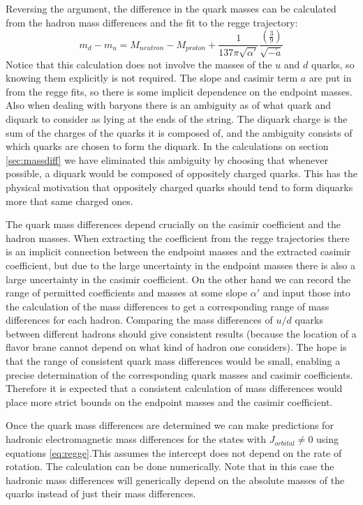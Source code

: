 \documentclass[11pt,a4paper]{article}
\begin{document}
Reversing the argument, the difference in the quark masses can be calculated from the hadron mass differences and the fit to the regge trajectory:
\begin{equation*}
m_{d}-m_{u}=M_{neutron}-M_{proton}+\frac{1}{137\pi\sqrt{\alpha'}}\frac{\left(\frac{3}{9}\right)}{\sqrt{-\tilde{a}}}
\end{equation*} 
Notice that this calculation does not involve the masses of the $u$ and $d$ quarks, so knowing them explicitly is not required. The slope and casimir term $a$ are put in from the regge fits, so there is some implicit dependence on the endpoint masses. Also when dealing with baryons there is an ambiguity as of what quark and diquark to consider as lying at the ends of the string. The diquark charge is the sum of the charges of the quarks it is composed of, and the ambiguity consists of which quarks are chosen to form the diquark. In the calculations on section \ref{sec:massdiff} we have eliminated this ambiguity by choosing that whenever possible, a diquark would be composed of oppositely charged quarks. This has the physical motivation that oppositely charged quarks should tend to form diquarks more that same charged ones.

The quark mass differences depend crucially on the casimir coefficient and the hadron masses. When extracting the coefficient from the regge trajectories there is an implicit connection between the endpoint masses and the extracted casimir coefficient, but due to the large uncertainty in the endpoint masses there is also a large uncertainty in the casimir coefficient. On the other hand we can record the range of permitted coefficients and masses at some slope $\alpha'$ and input those into the calculation of the mass differences to get a corresponding range of mass differences for each hadron. Comparing the mass differences of $u/d$ quarks between different hadrons should give consistent results (because the location of a flavor brane cannot depend on what kind of hadron one considers). The hope is that the range of consistent quark mass differences would be small, enabling a precise determination of the corresponding quark masses and casimir coefficients. Therefore it is expected that a consistent calculation of mass differences would place more strict bounds on the endpoint masses and the casimir coefficient.

Once the quark mass differences are determined we can make predictions for hadronic electromagnetic mass differences for the states with $J_{orbital}\neq 0$ using equations \ref{eq:regge}.This assumes the intercept does not depend on the rate of rotation. The calculation can be done numerically. Note that in this case the hadronic mass differences will generically depend on the absolute masses of the quarks instead of just their mass differences.
\end{document}
